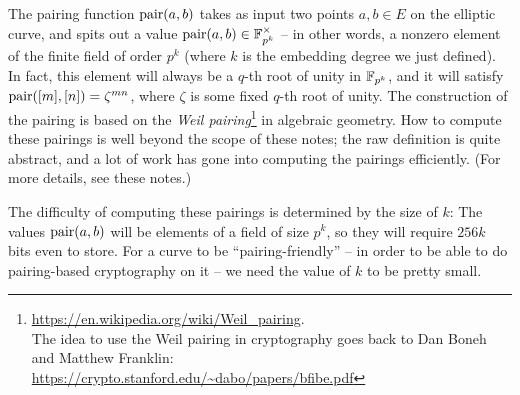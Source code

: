 The pairing function $\operatorname{pair}(a,b)$ takes as input two
points $a,b \in E$ on the elliptic curve, and spits out a value
$\operatorname{pair}(a,b) \in \mathbb{F}_{p^{k}}^{\times}$ -- in
other words, a nonzero element of the finite field of order $p^{k}$
(where $k$ is the embedding degree we just defined). In fact, this
element will always be a $q$-th root of unity in
$\mathbb{F}_{p^{k}}$, and it will satisfy
$\operatorname{pair}([m],[n]) = \zeta^{mn}$,
where $\zeta$ is some fixed $q$-th root of unity. The construction
of the pairing is based on the \emph{Weil pairing}\footnote{\url{https://en.wikipedia.org/wiki/Weil\_pairing}.\\
The idea to use the Weil pairing in cryptography goes back to Dan Boneh and Matthew Franklin: \\
\url{https://crypto.stanford.edu/~dabo/papers/bfibe.pdf}}
in algebraic geometry. How to compute these pairings is well beyond the
scope of these notes; the raw definition is quite abstract, and a lot of
work has gone into computing the pairings efficiently. (For more
details, see these notes.)

The difficulty of computing these pairings is determined by the size of
$k$: The values $\operatorname{pair}(a,b)$ will be elements of a
field of size $p^{k}$, so they will require $256k$ bits even to
store. For a curve to be ``pairing-friendly'' -- in order to be able to
do pairing-based cryptography on it -- we need the value of $k$ to be
pretty small.
